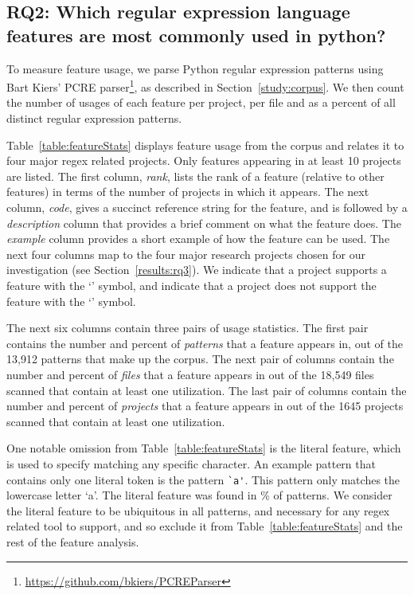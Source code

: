 \subsection{RQ2: Which regular expression language features are most commonly used in python?}
\label{results:re2}

To measure feature usage, we parse Python regular expression patterns using Bart Kiers' PCRE parser\footnote{\url{https://github.com/bkiers/PCREParser}}, as described in Section~\ref{study:corpus}.  We then count the number of usages of each feature per project, per file and as a percent of all distinct regular expression patterns.

Table~\ref{table:featureStats} displays feature usage from the corpus and relates it to four major regex related projects. Only features appearing in at least 10 projects are listed.
The first column, \emph{rank}, lists the rank of a feature (relative to other features) in terms of the number of projects in which it appears. The next column, \emph{code}, gives a succinct reference string for the feature, and is followed by a \emph{description} column that provides a brief comment on what the feature does.  The \emph{example} column provides a short example of how the feature can be used.
The next four columns map to the four major research projects chosen for our investigation (see Section~\ref{results:rq3}).  We indicate that a project supports a feature with the `\yes' symbol, and indicate that a project does not support the feature with the `\no' symbol.

The next six columns contain three pairs of usage statistics.  The first pair contains the number and percent of \emph{patterns} that a feature appears in, out of the 13,912 patterns that make up the corpus. The next pair of columns contain the number and percent of \emph{files} that a feature appears in out of the 18,549 files scanned that contain at least one utilization.  The last pair of columns contain the number and percent of \emph{projects} that a feature appears in out of the 1645 projects scanned that contain at least one utilization.

One notable omission from Table~\ref{table:featureStats} is the literal feature, which is used  to specify matching any specific character.  An example pattern that contains only one literal token is the pattern \verb!`a'!.  This pattern only matches the lowercase letter `a'.  The literal feature was found in \% of patterns.
We consider the literal feature to be ubiquitous in all patterns, and necessary for any regex related tool to support, and so exclude it from Table~\ref{table:featureStats} and the rest of the feature analysis.


